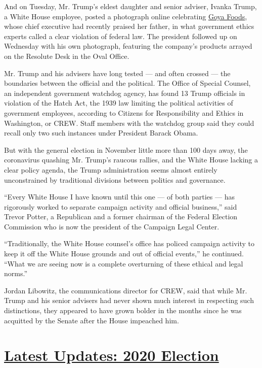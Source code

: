 And on Tuesday, Mr. Trump's eldest daughter and senior adviser, Ivanka
Trump, a White House employee, posted a photograph online celebrating
\href{https://www.nytimes.com/2020/07/19/us/goya-trump-hispanic-vote.html}{Goya
Foods}, whose chief executive had recently praised her father, in what
government ethics experts called a clear violation of federal law. The
president followed up on Wednesday with his own photograph, featuring
the company's products arrayed on the Resolute Desk in the Oval Office.

Mr. Trump and his advisers have long tested --- and often crossed ---
the boundaries between the official and the political. The Office of
Special Counsel, an independent government watchdog agency, has found 13
Trump officials in violation of the Hatch Act, the 1939 law limiting the
political activities of government employees, according to Citizens for
Responsibility and Ethics in Washington, or CREW. Staff members with the
watchdog group said they could recall only two such instances under
President Barack Obama.

But with the general election in November little more than 100 days
away, the coronavirus quashing Mr. Trump's raucous rallies, and the
White House lacking a clear policy agenda, the Trump administration
seems almost entirely unconstrained by traditional divisions between
politics and governance.

``Every White House I have known until this one --- of both parties ---
has rigorously worked to separate campaign activity and official
business,'' said Trevor Potter, a Republican and a former chairman of
the Federal Election Commission who is now the president of the Campaign
Legal Center.

``Traditionally, the White House counsel's office has policed campaign
activity to keep it off the White House grounds and out of official
events,'' he continued. ``What we are seeing now is a complete
overturning of these ethical and legal norms.''

Jordan Libowitz, the communications director for CREW, said that while
Mr. Trump and his senior advisers had never shown much interest in
respecting such distinctions, they appeared to have grown bolder in the
months since he was acquitted by the Senate after the House impeached
him.

\hypertarget{latest-updates-2020-election}{%
\section{\texorpdfstring{\href{https://www.nytimes.com/2020/07/31/us/elections/biden-vs-trump.html?action=click\&pgtype=Article\&state=default\&region=MAIN_CONTENT_1\&context=storylines_live_updates}{Latest
Updates: 2020
Election}}{Latest Updates: 2020 Election}}\label{latest-updates-2020-election}}

